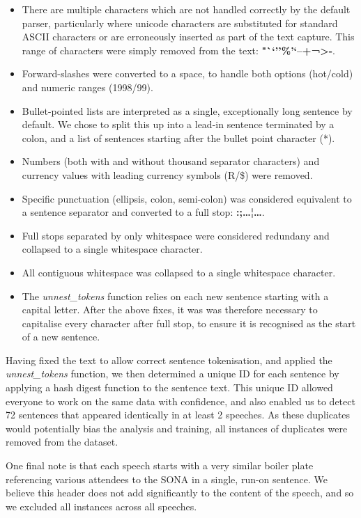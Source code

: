 \documentclass[]{article}
\begin{document}
\begin{itemize}
\item
  There are multiple characters which are not handled correctly by the
  default parser, particularly where unicode characters are substituted
  for standard ASCII characters or are erroneously inserted as part of
  the text capture. This range of characters were simply removed from
  the text: \textbf{"``''\%'`\href{}{}--+¬\textgreater{}-}.
\item
  Forward-slashes were converted to a space, to handle both options
  (hot/cold) and numeric ranges (1998/99).
\item
  Bullet-pointed lists are interpreted as a single, exceptionally long
  sentence by default. We chose to split this up into a lead-in sentence
  terminated by a colon, and a list of sentences starting after the
  bullet point character (*).
\item
  Numbers (both with and without thousand separator characters) and
  currency values with leading currency symbols (R/\$) were removed.
\item
  Specific punctuation (ellipsis, colon, semi-colon) was considered
  equivalent to a sentence separator and converted to a full stop:
  \textbf{:;\ldots{}¦\ldots{}}.
\item
  Full stops separated by only whitespace were considered redundany and
  collapsed to a single whitespace character.
\item
  All contiguous whitespace was collapsed to a single whitespace
  character.
\item
  The \emph{unnest\_tokens} function relies on each new sentence
  starting with a capital letter. After the above fixes, it was was
  therefore necessary to capitalise every character after full stop, to
  ensure it is recognised as the start of a new sentence.
\end{itemize}

Having fixed the text to allow correct sentence tokenisation, and
applied the \emph{unnest\_tokens} function, we then determined a unique
ID for each sentence by applying a hash digest function to the sentence
text. This unique ID allowed everyone to work on the same data with
confidence, and also enabled us to detect 72 sentences that appeared
identically in at least 2 speeches. As these duplicates would
potentially bias the analysis and training, all instances of duplicates
were removed from the dataset.

One final note is that each speech starts with a very similar boiler
plate referencing various attendees to the SONA in a single, run-on
sentence. We believe this header does not add significantly to the
content of the speech, and so we excluded all instances across all
speeches.
\end{document}
